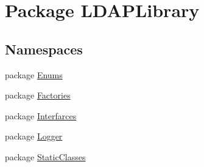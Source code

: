 \hypertarget{namespace_l_d_a_p_library}{}\section{Package L\+D\+A\+P\+Library}
\label{namespace_l_d_a_p_library}
\subsection*{Namespaces}
\begin{DoxyCompactItemize}
\item 
package \hyperlink{namespace_l_d_a_p_library_1_1_enums}{Enums}
\item 
package \hyperlink{namespace_l_d_a_p_library_1_1_factories}{Factories}
\item 
package \hyperlink{namespace_l_d_a_p_library_1_1_interfarces}{Interfarces}
\item 
package \hyperlink{namespace_l_d_a_p_library_1_1_logger}{Logger}
\item 
package \hyperlink{namespace_l_d_a_p_library_1_1_static_classes}{Static\+Classes}
\end{DoxyCompactItemize}
